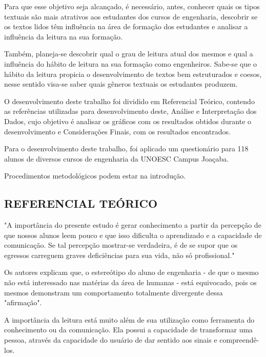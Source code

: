 \documentclass[
	article,			%
	11pt,				%
	oneside,			%
	a4paper,			%
	english,			%
	brazil,				%
	sumario=tradicional
	]{abntex2}
\begin{document}
Para que esse objetivo seja alcançado, é necessário, antes, conhecer quais os tipos textuais são mais atrativos aos estudantes dos cursos de engenharia, descobrir se os textos lidos têm influência na área de formação dos estudantes e analisar a influência da leitura na sua formação.

Também, planeja-se descobrir qual o grau de leitura atual dos mesmos e qual a influência do hábito de leitura na sua formação como engenheiros. Sabe-se que o hábito da leitura propicia o desenvolvimento de textos bem estruturados e coesos, nesse sentido visa-se saber quais gêneros textuais os estudantes produzem.

O desenvolvimento deste trabalho foi dividido em Referencial Teórico, contendo as referências utilizadas para desenvolvimento deste, Análise e Interpretação dos Dados, cujo objetivo é analisar os gráficos com os resultados obtidos durante o desenvolvimento e Considerações Finais, com os resultados encontrados.

Para o desenvolvimento deste trabalho, foi aplicado um questionário para 118 alunos de diversos cursos de engenharia da UNOESC Campus Joaçaba. 

Procedimentos metodológicos podem estar na introdução.


\subsection{REFERENCIAL TEÓRICO}
"A importância do presente estudo é gerar conhecimento a partir da percepção de que nossos alunos leem pouco e que isso dificulta o aprendizado e a capacidade de comunicação. Se tal percepção mostrar-se verdadeira, é de se supor que os egressos carreguem graves deficiências para sua vida, não só profissional." \cite[p.9.132]{habitosleit}

Os autores  explicam que, o estereótipo do aluno de engenharia - de que o mesmo não está interessado nas matérias da área de humanas - está equivocado, pois os mesmos demonstram um comportamento totalmente divergente dessa "afirmação".

A importância da leitura está muito além de sua utilização como ferramenta do conhecimento ou da comunicação. Ela possui a capacidade de transformar uma pessoa, através da capacidade do usuário de dar sentido aos sinais e compreendê-los.
\end{document}
